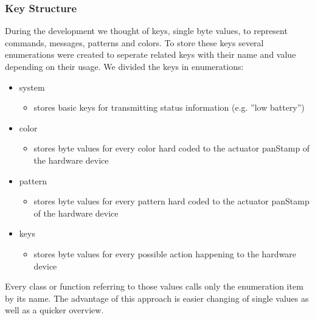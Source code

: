 \subsubsection{Key Structure}
During the development we thought of keys, single byte values, to represent commands, messages, patterns and colors. To store these keys several enumerations were created to seperate related keys with their name and value depending on their usage.
We divided the keys in enumerations:
\begin{itemize}
    \item system
    \begin{itemize}
         \item stores basic keys for transmitting status information (e.g. ''low battery'')
    \end{itemize}
    \item color
    \begin{itemize}
        \item stores byte values for every color hard coded to the actuator panStamp of the hardware device
    \end{itemize}
    \item pattern
    \begin{itemize}
        \item stores byte values for every pattern hard coded to the actuator panStamp of the hardware device
    \end{itemize}
    \item keys
    \begin{itemize}
        \item stores byte values for every possible action happening to the hardware device
    \end{itemize}
\end{itemize} 

Every class or function referring to those values calls only the enumeration item by its name. The advantage of this approach is easier changing of single values as well as a quicker overview.
